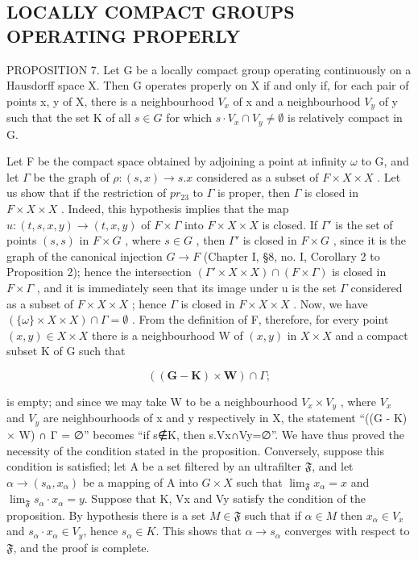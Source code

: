 \subsection{LOCALLY COMPACT GROUPS OPERATING PROPERLY}

PROPOSITION 7. Let G be a locally compact group operating continuously on a Hausdorff space X. Then G operates properly on X if and only if, for each pair of points x, y of X, there is a neighbourhood \(V_{x}\) of x and a neighbourhood \(V_{y}\) of y such that the set K of all \(s \in G\) for which \(s \cdot V_{x} \cap V_{y} \neq \emptyset\) is relatively compact in G.

Let F be the compact space obtained by adjoining a point at infinity \(\omega\) to G, and let \(\Gamma\) be the graph of \(\rho: (s, x) \to s.x\) considered as a subset of \(F \times X \times X\) . Let us show that if the restriction of \(pr_{23}\) to \(\Gamma\) is proper, then \(\Gamma\) is closed in \(F \times X \times X\) . Indeed, this hypothesis implies that the map \(u: (t, s, x, y) \to (t, x, y)\) of \(F \times \Gamma\) into \(F \times X \times X\) is closed. If \(\Gamma'\) is the set of points \((s, s)\) in \(F \times G\) , where \(s \in G\) , then \(\Gamma'\) is closed in \(F \times G\) , since it is the graph of the canonical injection \(G \to F\) (Chapter I, §8, no. I, Corollary 2 to Proposition 2); hence the intersection \((\Gamma' \times X \times X) \cap (F \times \Gamma)\) is closed in \(F \times \Gamma\) , and it is immediately seen that its image under u is the set \(\Gamma\) considered as a subset of \(F \times X \times X\) ; hence \(\Gamma\) is closed in \(F \times X \times X\) . Now, we have \((\{\omega\} \times X \times X) \cap \Gamma = \emptyset\) . From the definition of F, therefore, for every point \((x, y) \in X \times X\) there is a neighbourhood W of \((x, y)\) in \(X \times X\) and a compact subset K of G such that

\[
((\mathbf {G} - \mathbf {K}) \times \mathbf {W}) \cap \Gamma ;
\]

is empty; and since we may take W to be a neighbourhood \(V_{x} \times V_{y}\) , where \(V_{x}\) and \(V_{y}\) are neighbourhoods of x and y respectively in X, the statement ``((G - K) × W) ∩ Γ = ∅'' becomes ``if s∉K, then s.Vx∩Vy=∅''. We have thus proved the necessity of the condition stated in the proposition. Conversely, suppose this condition is satisfied; let A be a set filtered by an ultrafilter \(\mathfrak{F}\), and let \(\alpha \to (s_{\alpha}, x_{\alpha})\) be a mapping of A into \(G \times X\) such that \(\lim_{\mathfrak{F}} x_{\alpha} = x\) and \(\lim_{\mathfrak{F}} s_{\alpha}\cdot x_{\alpha} = y\). Suppose that K, Vx and Vy satisfy the condition of the proposition. By hypothesis there is a set \(M \in \mathfrak{F}\) such that if \(\alpha \in M\) then \(x_{\alpha} \in V_{x}\) and \(s_{\alpha}\cdot x_{\alpha} \in V_{y}\), hence \(s_{\alpha} \in K\). This shows that \(\alpha \to s_{\alpha}\) converges with respect to \(\mathfrak{F}\), and the proof is complete.

